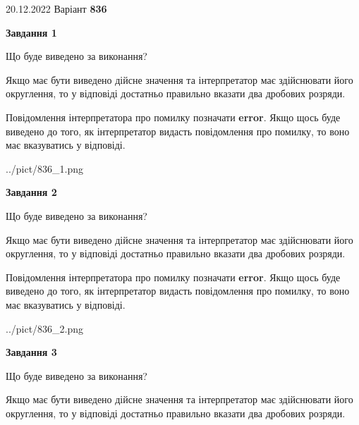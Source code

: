 \documentclass[12pt, ukrainian]{article}
\begin{document}
{20.12.2022 Варіант \No \textbf { 836 }\par}
{
\begin {Large}

{\begin {center}\textbf{Завдання 1}\end {center}}\par
Що буде виведено за виконання? \par

Якщо має бути виведено дійсне значення та інтерпретатор має здійснювати його округлення, 
то у відповіді достатньо правильно вказати два дробових розряди.

Повідомлення інтерпретатора про помилку позначати \textbf{error}.
Якщо щось буде виведено до того, як інтерпретатор видасть повідомлення про помилку, 
то воно має вказуватись у відповіді. \par

\begin{center}
	{../pict/836_1.png}
\end{center}
\newpage

{\begin {center}\textbf{Завдання 2}\end {center}}\par
Що буде виведено за виконання? \par

Якщо має бути виведено дійсне значення та інтерпретатор має здійснювати його округлення, 
то у відповіді достатньо правильно вказати два дробових розряди.

Повідомлення інтерпретатора про помилку позначати \textbf{error}.
Якщо щось буде виведено до того, як інтерпретатор видасть повідомлення про помилку, 
то воно має вказуватись у відповіді. \par

\begin{center}
	{../pict/836_2.png}
\end{center}
\newpage

{\begin {center}\textbf{Завдання 3}\end {center}}\par
Що буде виведено за виконання? \par

Якщо має бути виведено дійсне значення та інтерпретатор має здійснювати його округлення, 
то у відповіді достатньо правильно вказати два дробових розряди.


\end{Large}}
\end{document}

